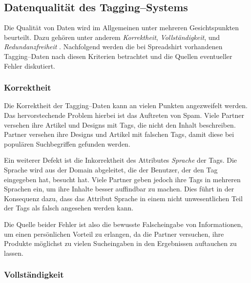 \subsection{Datenqualität des Tagging--Systems}
\label{quality}

Die Qualität von Daten wird im Allgemeinen unter mehreren Gesichtspunkten beurteilt. Dazu gehören unter anderem \emph{Korrektheit}, \emph{Vollständigkeit}, und \emph{Redundanzfreiheit} \cite[S. 84 f.]{hkp2012}. Nachfolgend werden die bei Spreadshirt vorhandenen Tagging--Daten nach diesen Kriterien betrachtet und die Quellen eventueller Fehler \cite[S. 43 f.]{jo2003} diskutiert.

\subsubsection{Korrektheit}

Die Korrektheit der Tagging--Daten kann an vielen Punkten angezweifelt werden. Das hervorstechende Problem hierbei ist das Auftreten von Spam. Viele Partner versehen ihre Artikel und Designs mit Tags, die nicht den Inhalt beschreiben. Partner versehen ihre Designs und Artikel mit falschen Tags, damit diese bei populären Suchbegriffen gefunden werden.

Ein weiterer Defekt ist die Inkorrektheit des Attributes \emph{Sprache} der Tags. Die Sprache wird aus der Domain abgeleitet, die der Benutzer, der den Tag eingegeben hat, besucht hat. Viele Partner geben jedoch ihre Tags in mehreren Sprachen ein, um ihre Inhalte besser auffindbar zu machen. Dies führt in der Konsequenz dazu, dass das Attribut Sprache in einem nicht unwesentlichen Teil der Tags als falsch angesehen werden kann.

Die Quelle beider Fehler ist also die bewusste Falscheingabe von Informationen, um einen persönlichen Vorteil zu erlangen, da die Partner versuchen, ihre Produkte möglichst zu vielen Sucheingaben in den Ergebnissen auftauchen zu lassen.
                                                                                                                                                                                                                                                                                                                                                                                                              
\subsubsection{Vollständigkeit}


